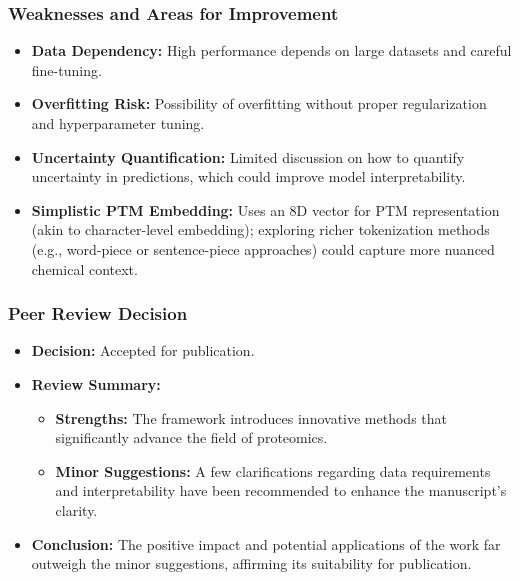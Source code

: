\documentclass{beamer}
\begin{document}
\begin{frame}
  \frametitle{Weaknesses and Areas for Improvement}
  \begin{itemize}
    \item \textbf{Data Dependency:} High performance depends on large datasets and careful fine-tuning.
    \item \textbf{Overfitting Risk:} Possibility of overfitting without proper regularization and hyperparameter tuning.
    \item \textbf{Uncertainty Quantification:} Limited discussion on how to quantify uncertainty in predictions, which could improve model interpretability.
    \item \textbf{Simplistic PTM Embedding:} Uses an 8D vector for PTM representation (akin to character-level embedding); exploring richer tokenization methods (e.g., word-piece or sentence-piece approaches) could capture more nuanced chemical context.
  \end{itemize}
\end{frame}


\begin{frame}
  \frametitle{Peer Review Decision}
  \begin{itemize}
    \item \textbf{Decision:} Accepted for publication.
    \item \textbf{Review Summary:}
      \begin{itemize}
        \item \textbf{Strengths:} The framework introduces innovative methods that significantly advance the field of proteomics.
        \item \textbf{Minor Suggestions:} A few clarifications regarding data requirements and interpretability have been recommended to enhance the manuscript's clarity.
      \end{itemize}
    \item \textbf{Conclusion:} The positive impact and potential applications of the work far outweigh the minor suggestions, affirming its suitability for publication.
  \end{itemize}
\end{frame}
\end{document}
